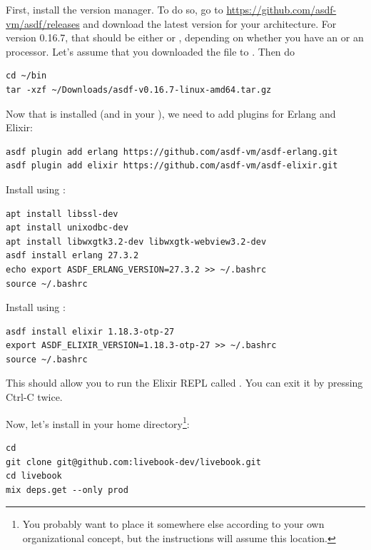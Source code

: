 First, install the  version manager. To do so, go to \url{https://github.com/asdf-vm/asdf/releases} and download the latest version for your architecture. For version 0.16.7, that should be either  or , depending on whether you have an  or an  processor. Let's assume that you downloaded the  file to . Then do

\begin{verbatim}
cd ~/bin
tar -xzf ~/Downloads/asdf-v0.16.7-linux-amd64.tar.gz
\end{verbatim}

Now that  is installed (and in your ), we need to add plugins for Erlang and Elixir:

\begin{verbatim}
asdf plugin add erlang https://github.com/asdf-vm/asdf-erlang.git
asdf plugin add elixir https://github.com/asdf-vm/asdf-elixir.git
\end{verbatim}

Install  using :

\begin{verbatim}
apt install libssl-dev
apt install unixodbc-dev
apt install libwxgtk3.2-dev libwxgtk-webview3.2-dev
asdf install erlang 27.3.2
echo export ASDF_ERLANG_VERSION=27.3.2 >> ~/.bashrc
source ~/.bashrc
\end{verbatim}

Install  using :

\begin{verbatim}
asdf install elixir 1.18.3-otp-27
export ASDF_ELIXIR_VERSION=1.18.3-otp-27 >> ~/.bashrc
source ~/.bashrc
\end{verbatim}

This should allow you to run the Elixir REPL called . You can exit it by pressing Ctrl-C twice.

Now, let's install  in your home directory\footnote{You probably want to place it somewhere else according to your own organizational concept, but the instructions will assume this location.}:

\begin{verbatim}
cd
git clone git@github.com:livebook-dev/livebook.git
cd livebook
mix deps.get --only prod
\end{verbatim}

